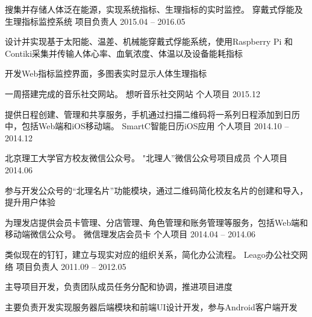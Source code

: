\begin{cventries}
\cventry
{搜集并存储人体泛在能源，实现系统指标、生理指标的实时监控。} %
{穿戴式俘能及生理指标监控系统} %
{项目负责人} %
{2015.04 -- 2016.05} %
{ %
\begin{cvitems}
\item {设计并实现基于太阳能、温差、机械能穿戴式俘能系统，使用Raspberry Pi 和Contiki采集并传输人体心率、血氧浓度、体温以及设备能耗指标}
\item {开发Web指标监控界面，多图表实时显示人体生理指标}
\end{cvitems} 
}

\cventry
{一周搭建完成的音乐社交网站。} %
{想听音乐社交网站} %
{个人项目} %
{2015.12} %
{ %
\begin{cvitems}
\end{cvitems} 
}


\cventry
{提供日程创建、管理和共享服务，手机通过扫描二维码将一系列日程添加到日历中，包括Web端和iOS移动端。} %
{SmartC智能日历iOS应用} %
{个人项目} %
{2014.10 -- 2014.12 } %
{ %
\begin{cvitems}
\end{cvitems} 
}

\cventry
{北京理工大学官方校友微信公众号。} %
{"北理人”微信公众号项目成员} %
{个人项目} %
{2014.06 } %
{ %
\begin{cvitems}
\item{参与开发公众号的“北理名片”功能模块，通过二维码简化校友名片的创建和导入，提升用户体验}
\end{cvitems} 
}

\cventry
{为理发店提供会员卡管理、分店管理、角色管理和账务管理等服务，包括Web端和移动端微信公众号。} %
{微信理发店会员卡} %
{个人项目} %
{2014.04 -- 2014.06 } %
{ %
\begin{cvitems}
\end{cvitems} 
}


\cventry
{类似现在的钉钉，建立与现实对应的组织关系，简化办公流程。} %
{Leago办公社交网络} %
{项目负责人} %
{2011.09 -- 2012.05  } %
{ %
\begin{cvitems}
\item{主导项目开发，负责团队成员任务分配和协调，推进项目进度}
\item{主要负责开发实现服务器后端模块和前端UI设计开发，参与Android客户端开发}
\end{cvitems} 
}



\end{cventries}

